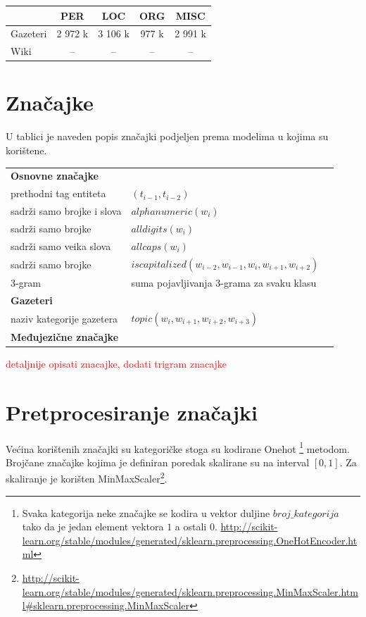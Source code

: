 \documentclass[times, utf8, seminar]{fer}
\newcommand\myworries[1]{\textcolor{red}{#1}}
\begin{document}
\begin{center}
\begin{tabular}{ lcccc }
\hline
 & PER & LOC & ORG & MISC\\ 
\hline
Gazeteri & 2 972 k & 3 106 k & 977 k & 2 991 k \\
Wiki & -- & -- & -- & -- \\
\hline
\end{tabular}
\end{center}



\section{Značajke}
U tablici je naveden popis značajki podjeljen prema modelima u kojima su korištene.

\begin{center}
\begin{tabular}{llr}
\hline
\textbf{Osnovne značajke} & \\
prethodni tag entiteta & $ (t_{i-1},t_{i-2}) $\\ 
sadrži samo brojke i slova & $ alphanumeric(w_i) $\\ 
sadrži samo brojke  & $ alldigits(w_i) $\\ 
sadrži samo veika slova & $ allcaps(w_i) $\\ 
sadrži samo brojke & $ iscapitalized(w_{i-2}, w_{i-1}, w_{i}, w_{i+1}, w_{i+2}) $\\
3-gram & suma pojavljivanja 3-grama za svaku klasu \\
\textbf{Gazeteri} & \\
naziv kategorije gazetera  & $ topic(w_{i}, w_{i+1}, w_{i+2}, w_{i+3}) $\\
\textbf{Međujezične značajke} & \\
\hline
\end{tabular}
\end{center}


\myworries{detaljnije opisati znacajke, dodati trigram znacajke}
\section{Pretprocesiranje značajki}
Većina korištenih značajki su kategoričke stoga su kodirane Onehot \footnote{Svaka kategorija neke značajke se kodira u vektor duljine $ broj\_kategorija $ tako da je jedan element vektora $ 1 $ a ostali $ 0 $. \url{http://scikit-learn.org/stable/modules/generated/sklearn.preprocessing.OneHotEncoder.html}} metodom. Brojčane značajke kojima je definiran poredak skalirane su na interval $ [0,1] $. Za skaliranje je korišten MinMaxScaler\footnote{\url{http://scikit-learn.org/stable/modules/generated/sklearn.preprocessing.MinMaxScaler.html\#sklearn.preprocessing.MinMaxScaler}}.
\end{document}
